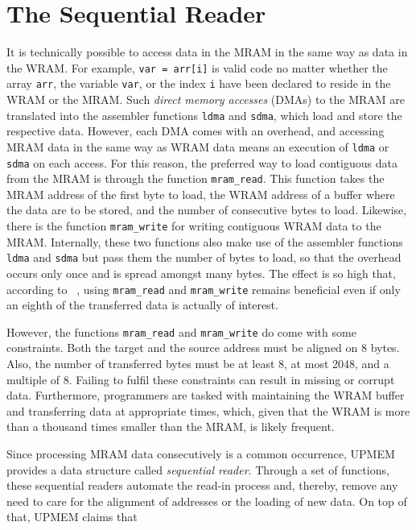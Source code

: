 \section{The Sequential Reader}
\label{sec:mram:seq_reader}

It is technically possible to access data in the MRAM in the same way as data in the WRAM.
For example, \lstinline|var = arr[i]| is valid code no matter whether the array \lstinline|arr|, the variable \lstinline|var|, or the index \lstinline|i| have been declared to reside in the WRAM or the MRAM.
Such \emph{direct memory accesses} (DMAs) to the MRAM are translated into the assembler functions \lstinline|ldma| and \lstinline|sdma|, which load and store the respective data.
However, each DMA comes with an overhead, and accessing MRAM data in the same way as WRAM data means an execution of \lstinline|ldma| or \lstinline|sdma| on each access.
For this reason, the preferred way to load contiguous data from the MRAM is through the function \lstinline|mram_read|.
This function takes the MRAM address of the first byte to load, the WRAM address of a buffer where the data are to be stored, and the number of consecutive bytes to load.
Likewise, there is the function \lstinline|mram_write| for writing contiguous WRAM data to the MRAM.
Internally, these two \langC{} functions also make use of the assembler functions \lstinline|ldma| and \lstinline|sdma| but pass them the number of bytes to load, so that the overhead occurs only once and is spread amongst many bytes.
The effect is so high that, according to \citeauthor{mutlu2022Benchmarking}~\cite[11]{mutlu2022Benchmarking}, using \lstinline|mram_read| and \lstinline|mram_write| remains beneficial even if only an eighth of the transferred data is actually of interest.

However, the functions \lstinline|mram_read| and \lstinline|mram_write| do come with some constraints.
Both the target and the source address must be aligned on 8 bytes.
Also, the number of transferred bytes must be at least 8, at most 2048, and a multiple of 8.
Failing to fulfil these constraints can result in missing or corrupt data.
Furthermore, programmers are tasked with maintaining the WRAM buffer and transferring data at appropriate times, which, given that the WRAM is more than a thousand times smaller than the MRAM, is likely frequent.

Since processing MRAM data consecutively is a common occurrence, UPMEM provides a data structure called \emph{sequential reader}.
Through a set of \langC{} functions, these sequential readers automate the read-in process and, thereby, remove any need to care for the alignment of addresses or the loading of new data.
On top of that, UPMEM claims that ~\cite[Memory management -- Sequential readers]{upmemSDK}


